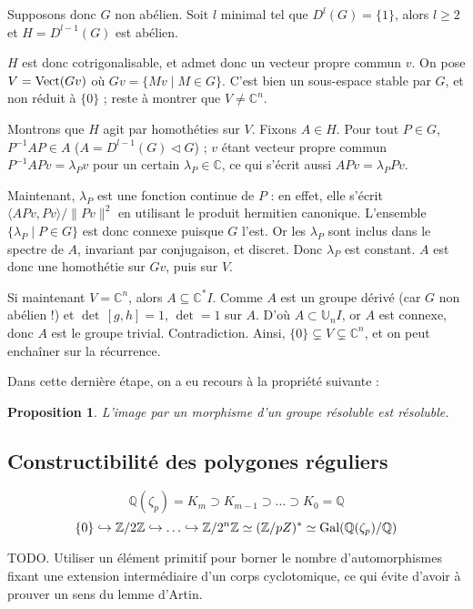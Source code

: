 \documentclass[a4paper, 11pt]{article}
\def\Z{\mathbb{Z}}
\def\Q{\mathbb{Q}}
\def\C{\mathbb{C}}
\def\Vect{\textnormal{Vect}}
\newtheorem*{proposition}{Proposition}
\begin{document}
Supposons donc $G$ non abélien. Soit $l$ minimal tel que $D^l(G) = \{1\}$, alors
$l \geq 2$ et $H = D^{l-1}(G)$ est abélien.

$H$ est donc cotrigonalisable, et admet donc un vecteur propre commun $v$. On
pose $V = \Vect(Gv)$ où $Gv = \{Mv \mid M \in G\}$. C'est bien un sous-espace
stable par $G$, et non réduit à $\{0\}$ ; reste à montrer que $V \neq \C^n$.

Montrons que $H$ agit par homothéties sur $V$. Fixons $A \in H$. Pour tout $P
\in G$, $P^{-1}AP \in A$ ($A = D^{l-1}(G) \triangleleft G$) ; $v$ étant vecteur
propre commun $P^{-1}APv = \lambda_P v$ pour un certain $\lambda_P \in \C$, ce
qui s'écrit aussi $APv = \lambda_P Pv$.

Maintenant, $\lambda_P$ est une fonction continue de $P$ : en effet, elle
s'écrit $\langle APv, Pv \rangle / \|Pv\|^2$ en utilisant le produit hermitien
canonique. L'ensemble $\{ \lambda_P \mid P \in G \}$ est donc connexe puisque
$G$ l'est. Or les $\lambda_P$ sont inclus dans le spectre de $A$, invariant par
conjugaison, et discret. Donc $\lambda_P$ est constant. $A$ est donc une
homothétie sur $Gv$, puis sur $V$.

Si maintenant $V = \C^n$, alors $A \subseteq \C^*I$. Comme $A$ est un groupe
dérivé (car $G$ non abélien !) et $\det\,[g,h] = 1$, $\det = 1$ sur $A$. D'où $A
\subset \mathbb{U}_nI$, or $A$ est connexe, donc $A$ est le groupe trivial.
Contradiction. Ainsi, $\{0\} \subsetneq V \subsetneq \C^n$, et on peut enchaîner
sur la récurrence.

Dans cette dernière étape, on a eu recours à la propriété suivante :
\begin{proposition}
  L'image par un morphisme d'un groupe résoluble est résoluble.
\end{proposition}

\newpage


\subsection{Constructibilité des polygones réguliers}

\[ \Q(\zeta_p) = K_m \supset K_{m-1} \supset \ldots \supset K_0 = \Q \]
\[ \{0\} \hookrightarrow \Z/2\Z \hookrightarrow \ldots \hookrightarrow \Z/2^n\Z
  \simeq (\Z/pZ)^* \simeq \textnormal{Gal}(\Q(\zeta_p)/\Q) \]

TODO. Utiliser un élément primitif pour borner le nombre d'automorphismes fixant
une extension intermédiaire d'un corps cyclotomique, ce qui évite d'avoir à
prouver un sens du lemme d'Artin.
\end{document}

